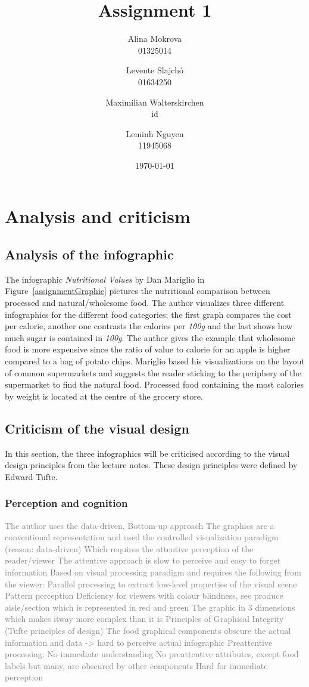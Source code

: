 \documentclass[a4paper]{scrartcl}
\title{Assignment 1}
\author{Alina Mokrova\\
				01325014
				\and
				Levente	Slajchó\\
				01634250
				\and
				Maximilian Walterskirchen\\
				id
				\and
				Leminh Nguyen\\
				11945068}
\date{\today}
\begin{document}
\maketitle

\section{Analysis and criticism}


\subsection{Analysis of the infographic}

The infographic \textit{Nutritional Values} by Dan Mariglio in
Figure~\ref{assignmentGraphic} pictures the nutritional comparison between
processed and natural/wholesome food. The author visualizes three different
infographics for the different food categories; the first graph compares the
cost per calorie, another one contrasts the calories per \textit{100g} and the
last shows how much sugar is contained in \textit{100g}. The author gives the
example that wholesome food is more expensive since the ratio of value to
calorie for an apple is higher compared to a bag of potato chips. Mariglio based
his visualizations on the layout of common supermarkets and suggests the reader
sticking to the periphery of the supermarket to find the natural food.
Processed food containing the most calories by weight is located at the centre
of the grocery store.

\subsection{Criticism of the visual design}

In this section, the three infographics will be criticised according to the
visual design principles from the lecture notes. These design principles were
defined by Edward Tufte\cite{Tufte2001}.

\subsubsection{Perception and cognition}

\textcolor{gray}{
The author uses the data-driven, Bottom-up approach
The graphics are a conventional representation and used the controlled visualization paradigm (reason: data-driven)
Which requires the attentive perception of the reader/viewer
The attentive approach is slow to perceive and easy to forget information
Based on visual processing paradigm and requires the following from the viewer:
Parallel processing to extract low-level properties of the visual scene
Pattern perception
Deficiency for viewers with colour blindness, see produce aisle/section which is represented in red and green
The graphic in 3 dimensions which makes itway more complex than it is
Principles of Graphical Integrity (Tufte principles of design)
The food graphical components obscure the actual information and data -> hard to perceive actual infographic
Preattentive processing:
No immediate understanding
No preattentive attributes, except food labels but many, are obscured by other components
Hard for immediate perception
}
\end{document}
